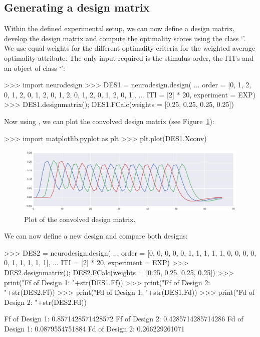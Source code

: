 \documentclass[article]{jss}
\begin{document}
\subsection{Generating a design matrix}
Within the defined experimental setup, we can now define a design
matrix, develop the design matrix and compute the optimality scores
using the class `'.  We use equal weights for the different
optimality criteria for the weighted average optimality attribute.
The only input required is the stimulus order, the ITI's and an object
of class `':
\begin{CodeChunk}
\begin{CodeInput}
>>> import neurodesign
>>> DES1 = neurodesign.design(
...   order = [0, 1, 2, 0, 1, 2, 0, 1, 2, 0, 1, 2, 0, 1, 2, 0, 1, 2, 0, 1],
...   ITI = [2] * 20, experiment = EXP)
>>> DES1.designmatrix(); DES1.FCalc(weights = [0.25, 0.25, 0.25, 0.25])
\end{CodeInput}
\end{CodeChunk}
%
Now using  \citep{matplotlib}, we can plot the
convolved design matrix (see Figure~\ref{fig:cov}):
\begin{CodeChunk}
\begin{CodeInput}
>>> import matplotlib.pyplot as plt
>>> plt.plot(DES1.Xconv)
\end{CodeInput}
\end{CodeChunk}
\begin{figure}[t!]
  \centering
  \includegraphics[scale=0.35]{Figure4.pdf}
  \caption{Plot of the convolved design matrix.\label{fig:cov}}
\end{figure}
We can now define a new design and compare both designs:
\begin{CodeChunk}
\begin{CodeInput}
>>> DES2 = neurodesign.design(
...   order = [0, 0, 0, 0, 0, 1, 1, 1, 1, 1, 0, 0, 0, 0, 0, 1, 1, 1, 1, 1],
...   ITI = [2] * 20, experiment = EXP)
>>> DES2.designmatrix(); DES2.FCalc(weights = [0.25, 0.25, 0.25, 0.25])
>>> print("Ff of Design 1: "+str(DES1.Ff))
>>> print("Ff of Design 2: "+str(DES2.Ff))
>>> print("Fd of Design 1: "+str(DES1.Fd))
>>> print("Fd of Design 2: "+str(DES2.Fd))
\end{CodeInput}
\begin{CodeOutput}
Ff of Design 1: 0.8571428571428572
Ff of Design 2: 0.4285714285714286
Fd of Design 1: 0.0879554751884
Fd of Design 2: 0.266229261071
\end{CodeOutput}
\end{CodeChunk}
\end{document}
